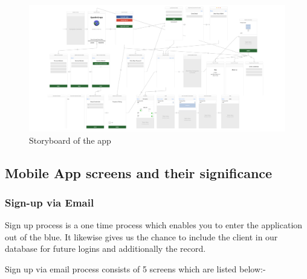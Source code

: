 \newpage

    \begin{figure}[H]
            \centering
            \includegraphics[width=\linewidth]{figures/ch4/storyboard_2.png}
            \caption{\label{fig:wireframe_3} Storyboard of the app}
    \end{figure}
    
\subsection{Mobile App screens and their significance}

\subsubsection{Sign-up via Email}

Sign up process is a one time process which enables you to enter the application out of the blue. It likewise gives us the chance to include the client in our database for future logins and additionally the record.

Sign up via email process consists of 5 screens which are listed below:-

\newpage

